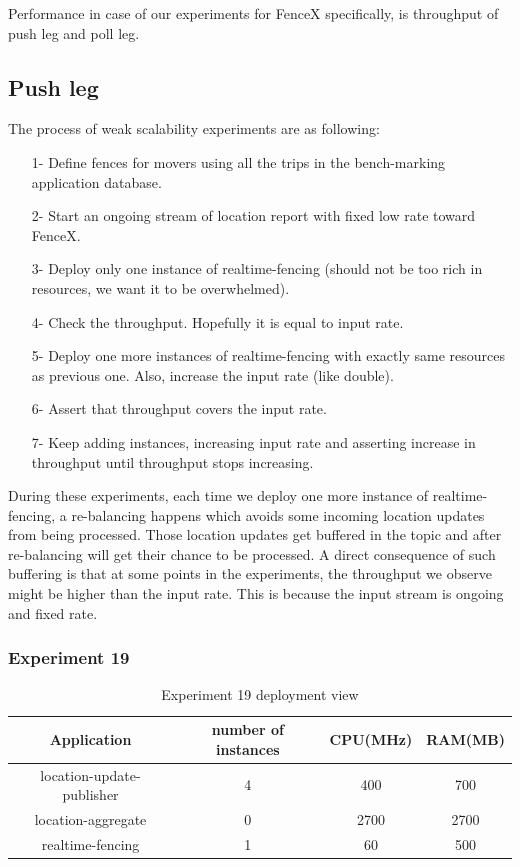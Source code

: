 \documentclass[a4]{report}
\begin{document}
    Performance in case of our experiments for FenceX specifically, is throughput of push leg and poll leg.

    \subsection{Push leg}
    The process of weak scalability experiments are as following:
    \begin{itemize}
        \item[1-] Define fences for movers using all the trips in the bench-marking application database.
        \item[2-] Start an ongoing stream of location report with fixed low rate toward FenceX.
        \item[3-] Deploy only one instance of realtime-fencing (should not be too rich in resources, we want it to
        be overwhelmed).
        \item[4-] Check the throughput. Hopefully it is equal to input rate.
        \item[5-] Deploy one more instances of realtime-fencing with exactly same resources as previous one. Also,
        increase the input rate (like double).
        \item[6-] Assert that throughput covers the input rate.
        \item[7-] Keep adding instances, increasing input rate and asserting increase in throughput until throughput
        stops increasing.
    \end{itemize}

    During these experiments, each time we deploy one more instance of realtime-fencing, a re-balancing happens which
    avoids some incoming location updates from being processed.
    Those location updates get buffered in the topic and after re-balancing will get their chance to be processed.
    A direct consequence of such buffering is that at some points in the experiments, the throughput we observe might be
    higher than the input rate.
    This is because the input stream is ongoing and fixed rate.

    \clearpage

    \subsubsection{Experiment 19}
    \begin{table}[h!]
        \centering
        \begin{tabular}{|c|c|c|c|}
            \hline
            Application               & number of instances & CPU(MHz) & RAM(MB) \\
            \hline
            location-update-publisher & 4                   & 400      & 700     \\
            location-aggregate        & 0                   & 2700     & 2700    \\
            realtime-fencing          & 1                   & 60       & 500     \\
            \hline
        \end{tabular}
        \caption{Experiment 19 deployment view}
        \label{table:ex19-dv}
    \end{table}
\end{document}
